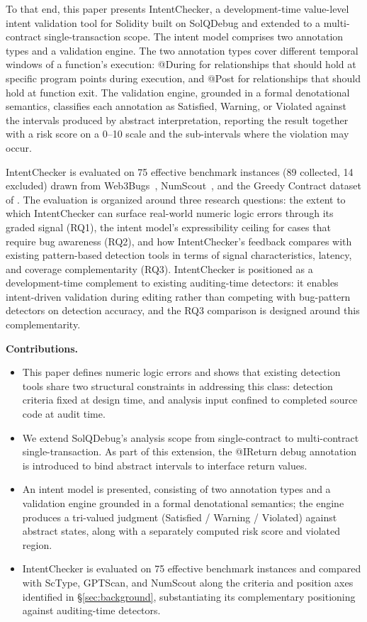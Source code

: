 \documentclass[pdflatex,sn-basic]{sn-jnl}%
\theoremstyle{thmstyleone}%
\theoremstyle{thmstyletwo}%
\theoremstyle{thmstylethree}%
\begin{document}
To that end, this paper presents IntentChecker, a development-time value-level intent validation tool for Solidity built on SolQDebug and extended to a multi-contract single-transaction scope.
The intent model comprises two annotation types and a validation engine. The two annotation types cover different temporal windows of a function's execution: @During for relationships that should hold at specific program points during execution, and @Post for relationships that should hold at function exit. The validation engine, grounded in a formal denotational semantics, classifies each annotation as Satisfied, Warning, or Violated against the intervals produced by abstract interpretation, reporting the result together with a risk score on a 0--10 scale and the sub-intervals where the violation may occur.

IntentChecker is evaluated on 75 effective benchmark instances (89 collected, 14 excluded) drawn from Web3Bugs~\citep{exploitablebugs}, NumScout~\citep{numscout}, and the Greedy Contract dataset of \citet{flyinointment}.
The evaluation is organized around three research questions: the extent to which IntentChecker can surface real-world numeric logic errors through its graded signal (RQ1), the intent model's expressibility ceiling for cases that require bug awareness (RQ2), and how IntentChecker's feedback compares with existing pattern-based detection tools in terms of signal characteristics, latency, and coverage complementarity (RQ3).
IntentChecker is positioned as a development-time complement to existing auditing-time detectors: it enables intent-driven validation during editing rather than competing with bug-pattern detectors on detection accuracy, and the RQ3 comparison is designed around this complementarity.

\smallskip
\noindent\textbf{Contributions.}
\begin{itemize}
    \item This paper defines numeric logic errors and shows that existing detection tools share two structural constraints in addressing this class: detection criteria fixed at design time, and analysis input confined to completed source code at audit time.
    \item We extend SolQDebug's analysis scope from single-contract to multi-contract single-transaction. As part of this extension, the @IReturn debug annotation is introduced to bind abstract intervals to interface return values.
    \item An intent model is presented, consisting of two annotation types and a validation engine grounded in a formal denotational semantics; the engine produces a tri-valued judgment (Satisfied / Warning / Violated) against abstract states, along with a separately computed risk score and violated region.
    \item IntentChecker is evaluated on 75 effective benchmark instances and compared with ScType, GPTScan, and NumScout along the criteria and position axes identified in §\ref{sec:background}, substantiating its complementary positioning against auditing-time detectors.
\end{itemize}
\end{document}
